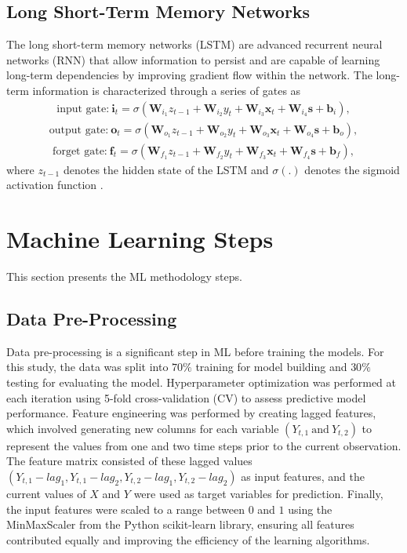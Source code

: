 \documentclass[twoside]{article}
\begin{document}
\subsection{Long Short-Term Memory Networks}
The long short-term memory networks (LSTM) are advanced recurrent neural networks (RNN) that allow information to persist and are capable of learning long-term dependencies \cite{Lim : 2021} by improving gradient flow within the network. The long-term information is characterized through a series of gates as 
\begin{align*}
\text{input gate:} \ \mathbf{i}_{t}  = \sigma \left( \mathbf{W}_{i_{1}} z_{t-1} + \mathbf{W}_{i_{2}}y_{t} + \mathbf{W}_{i_{3}}\mathbf{x}_{t} + \mathbf{W}_{i_{4}}\mathbf{s}+\mathbf{b}_{i} \right),
\end{align*}
\begin{align*}
    \text{output gate:} \ \mathbf{o}_{t} = \sigma \left( \mathbf{W}_{o_{1}} z_{t-1} + \mathbf{W}_{o_{2}}y_{t} + \mathbf{W}_{o_{3}}\mathbf{x}_{t} + \mathbf{W}_{o_{4}}\mathbf{s}+\mathbf{b}_{o} \right),
\end{align*}
\begin{align*}
    \text{forget gate:} \ \mathbf{f}_{t} = \sigma \left( \mathbf{W}_{f_{1}} z_{t-1} + \mathbf{W}_{f_{2}}y_{t} + \mathbf{W}_{f_{3}}\mathbf{x}_{t} + \mathbf{W}_{f_{4}}\mathbf{s}+\mathbf{b}_{f} \right),
\end{align*}
where $z_{t-1}$ denotes the hidden state of the LSTM and $\sigma (.)$ denotes the sigmoid activation function \cite{Lim : 2021}.
\section{Machine Learning Steps}%
This section presents the ML methodology steps.
\subsection{Data Pre-Processing}
Data pre-processing is a significant step in ML before training the models. For this study, the data was split into $70\%$ training for model building and $30\%$ testing for evaluating the model. Hyperparameter optimization was performed at each iteration using 5-fold cross-validation (CV) to assess predictive model performance.
Feature engineering was performed by creating lagged features, which involved generating new columns for each variable $(Y_{t,1} \ \text{and} \ Y_{t,2})$ to represent the values from one and two time steps prior to the current observation. The feature matrix consisted of these lagged values $(Y_{t,1}-lag_{1}, Y_{t,1}-lag_{2}, Y_{t,2}-lag_{1}, Y_{t,2}-lag_{2})$ as input features, and the current values of $X$ and $Y$ were used as target variables for prediction. Finally, the input features were scaled to a range between $0$ and $1$ using the MinMaxScaler from the Python scikit-learn library, ensuring all features contributed equally and improving the efficiency of the learning algorithms.
\end{document}
